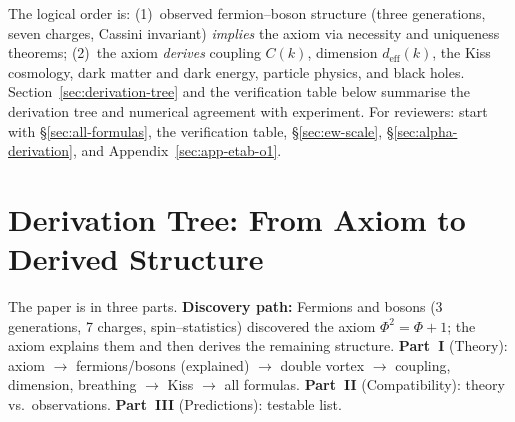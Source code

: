 \documentclass[12pt,a4paper]{article}
\begin{document}
The logical order is: (1)~observed fermion--boson structure (three generations, seven charges, Cassini invariant) \emph{implies} the axiom via necessity and uniqueness theorems; (2)~the axiom \emph{derives} coupling $C(k)$, dimension $d_{\mathrm{eff}}(k)$, the Kiss cosmology, dark matter and dark energy, particle physics, and black holes. Section~\ref{sec:derivation-tree} and the verification table below summarise the derivation tree and numerical agreement with experiment. For reviewers: start with \S\ref{sec:all-formulas}, the verification table, \S\ref{sec:ew-scale}, \S\ref{sec:alpha-derivation}, and Appendix~\ref{sec:app-etab-o1}.

\section*{Derivation Tree: From Axiom to Derived Structure}
\label{sec:derivation-tree}

\noindent The paper is in three parts. \textbf{Discovery path:} Fermions and bosons (3 generations, 7 charges, spin--statistics) discovered the axiom $\Phi^2 = \Phi + 1$; the axiom explains them and then derives the remaining structure. \textbf{Part~I} (Theory): axiom $\to$ fermions/bosons (explained) $\to$ double vortex $\to$ coupling, dimension, breathing $\to$ Kiss $\to$ all formulas. \textbf{Part~II} (Compatibility): theory vs.\ observations. \textbf{Part~III} (Predictions): testable list.

\bigskip
\begin{center}
\end{center}
\end{document}
